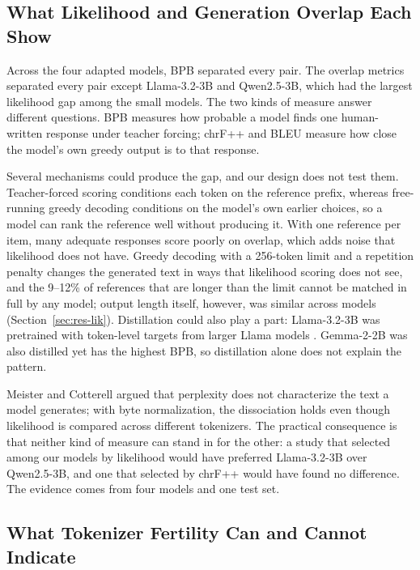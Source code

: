 \documentclass{article}
\begin{document}
\subsection{What Likelihood and Generation Overlap Each Show}

Across the four adapted models, BPB separated every pair. The overlap metrics separated every pair except Llama-3.2-3B and Qwen2.5-3B, which had the largest likelihood gap among the small models. The two kinds of measure answer different questions. BPB measures how probable a model finds one human-written response under teacher forcing; chrF++ and BLEU measure how close the model's own greedy output is to that response.

Several mechanisms could produce the gap, and our design does not test them. Teacher-forced scoring conditions each token on the reference prefix, whereas free-running greedy decoding conditions on the model's own earlier choices, so a model can rank the reference well without producing it. With one reference per item, many adequate responses score poorly on overlap, which adds noise that likelihood does not have. Greedy decoding with a 256-token limit and a repetition penalty changes the generated text in ways that likelihood scoring does not see, and the 9–12\% of references that are longer than the limit cannot be matched in full by any model; output length itself, however, was similar across models (Section~\ref{sec:res-lik}). Distillation could also play a part: Llama-3.2-3B was pretrained with token-level targets from larger Llama models \citep{meta2024b}. Gemma-2-2B was also distilled \citep{gemma2024} yet has the highest BPB, so distillation alone does not explain the pattern.

Meister and Cotterell \citep{meister2021} argued that perplexity does not characterize the text a model generates; with byte normalization, the dissociation holds even though likelihood is compared across different tokenizers. The practical consequence is that neither kind of measure can stand in for the other: a study that selected among our models by likelihood would have preferred Llama-3.2-3B over Qwen2.5-3B, and one that selected by chrF++ would have found no difference. The evidence comes from four models and one test set.

\subsection{What Tokenizer Fertility Can and Cannot Indicate}\label{sec:disc-fert}
\end{document}
